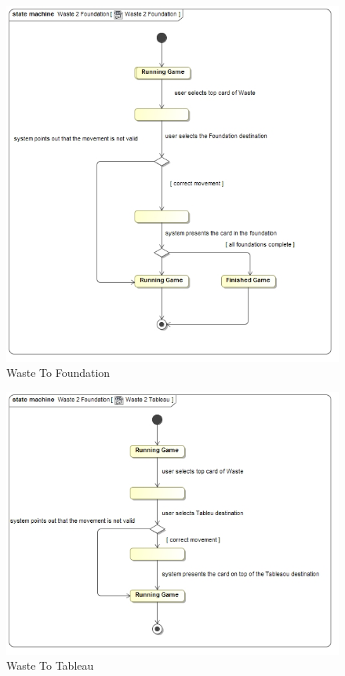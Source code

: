 \documentclass[11pt]{article}
\begin{document}
\begin{center}

\begin{figure}[H]
 \begin{center}
   \includegraphics[width=14cm]{DomainModel/Waste2Foundation.jpg}
   \caption{Waste To Foundation}
   \label{fig:waste2foundation}
 \end{center}
 \end{figure}
\end{center}

\begin{center}
 \begin{figure}[H]
 \begin{center}
   \includegraphics[width=14cm]{DomainModel/Waste2Tableau.jpg}
   \caption{Waste To Tableau}
   \label{fig:waste2tableau}
 \end{center}
 \end{figure}
\end{center}
\end{document}
